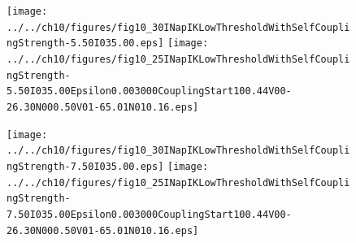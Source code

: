 \documentclass{article}
\begin{document}
\begin{figure}
\begin{center}
\texttt{[image: ../../ch10/figures/fig10\_30INapIKLowThresholdWithSelfCouplingStrength-5.50I035.00.eps]}
\texttt{[image: ../../ch10/figures/fig10\_25INapIKLowThresholdWithSelfCouplingStrength-5.50I035.00Epsilon0.003000CouplingStart100.44V00-26.30N000.50V01-65.01N010.16.eps]}

\caption{}

\label{fig:selfCoupling-5.5} 
\end{center}
\end{figure} 

\begin{figure}
\begin{center}
\texttt{[image: ../../ch10/figures/fig10\_30INapIKLowThresholdWithSelfCouplingStrength-7.50I035.00.eps]}
\texttt{[image: ../../ch10/figures/fig10\_25INapIKLowThresholdWithSelfCouplingStrength-7.50I035.00Epsilon0.003000CouplingStart100.44V00-26.30N000.50V01-65.01N010.16.eps]}

\caption{}

\label{fig:selfCoupling-7.5} 
\end{center}
\end{figure} 



\end{document}
